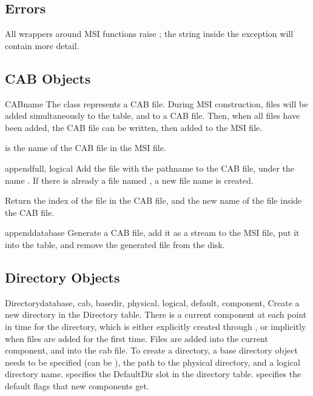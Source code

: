\subsection{Errors\label{msi-errors}}

All wrappers around MSI functions raise ;
the string inside the exception will contain more detail.

\subsection{CAB Objects\label{cab}}

\begin{classdesc}{CAB}{name}
  The class  represents a CAB file. During MSI construction,
  files will be added simultaneously to the  table, and
  to a CAB file. Then, when all files have been added, the CAB file
  can be written, then added to the MSI file.

   is the name of the CAB file in the MSI file.
\end{classdesc}

\begin{methoddesc}[CAB]{append}{full, logical}
  Add the file with the pathname  to the CAB file,
  under the name . If there is already a file
  named , a new file name is created.

  Return the index of the file in the CAB file, and the
  new name of the file inside the CAB file.
\end{methoddesc}

\begin{methoddesc}[CAB]{append}{database}
  Generate a CAB file, add it as a stream to the MSI file,
  put it into the  table, and remove the generated
  file from the disk.
\end{methoddesc}

\subsection{Directory Objects\label{msi-directory}}

\begin{classdesc}{Directory}{database, cab, basedir, physical, 
                  logical, default, component, }
  Create a new directory in the Directory table. There is a current
  component at each point in time for the directory, which is either
  explicitly created through , or implicitly when files
  are added for the first time. Files are added into the current
  component, and into the cab file.  To create a directory, a base
  directory object needs to be specified (can be ), the path to
  the physical directory, and a logical directory name.  
  specifies the DefaultDir slot in the directory table. 
  specifies the default flags that new components get.
\end{classdesc}

